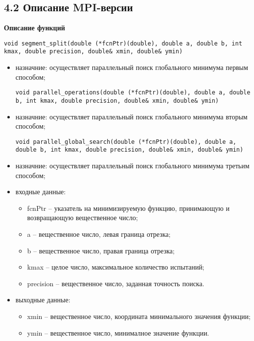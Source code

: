 \documentclass{report}
\begin{document}
\subsection*{4.2 Описание MPI-версии}
\textbf{Описание функций}
\begin{lstlisting}
void segment_split(double (*fcnPtr)(double), double a, double b, int kmax, double precision, double& xmin, double& ymin)
\end{lstlisting}
\begin{itemize}
  \item назначние: осуществляет параллельный поиск глобального минимума первым способом;
\begin{lstlisting}
void parallel_operations(double (*fcnPtr)(double), double a, double b, int kmax, double precision, double& xmin, double& ymin)
\end{lstlisting}
  \item назначние: осуществляет параллельный поиск глобального минимума вторым способом;
\begin{lstlisting}
void parallel_global_search(double (*fcnPtr)(double), double a, double b, int kmax, double precision, double& xmin, double& ymin)
\end{lstlisting}
  \item назначние: осуществляет параллельный поиск глобального минимума третьим способом;
  \item входные данные:
  \begin{itemize}	
    \item fcnPtr – указатель на минимизируемую функцию, принимающую и возвращающую вещественное число;
    \item a – вещественное число, левая граница отрезка;
	\item b – вещественное число, правая граница отрезка;
    \item kmax – целое число, максимальное количество испытаний;
	\item precision – вещественное число, заданная точность поиска.
  \end{itemize}
  \item выходные данные:
  \begin{itemize}
	\item xmin – вещественное число, координата минимального значения функции;
	\item ymin – вещественное число, минималное значение функции.
  \end{itemize}
\end{itemize}
\end{document}
